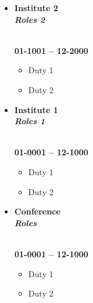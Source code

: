 \noindent\makebox[\linewidth]{\rule{\linewidth}{1.1pt}}
\vspace{-0.5cm}
\begin{itemize} \setlength\itemsep{-0.4em}
	\item \begin{multicols}{2}
		\begin{flushleft}
			\textbf{Institute 2}
			\\
			\textbf{\textit{Roles 2}}
		\end{flushleft}
		\columnbreak
		\begin{flushright}
			\hspace*{1em} \\
			\textbf{01-1001 -- 12-2000} 
		\end{flushright}
	\end{multicols}
	
	\vspace{-0.3cm}
	\begin{itemize}
		\item Duty 1
		\item Duty 2
	\end{itemize}
	
	\item \begin{multicols}{2}
		\begin{flushleft}
			\textbf{Institute 1}
			\\
			\textbf{\textit{Roles 1}}
		\end{flushleft}
		\columnbreak
		\begin{flushright}
			\hspace*{1em} \\
			\textbf{01-0001 -- 12-1000} 
		\end{flushright}
	\end{multicols}
	
	\vspace{-0.3cm}
	\begin{itemize}
		\item Duty 1
		\item Duty 2
	\end{itemize}
	
	\item \begin{multicols}{2}
		\begin{flushleft}
			\textbf{Conference}
			\\
			\textbf{\textit{Roles}}
		\end{flushleft}
		\columnbreak
		\begin{flushright}
			\hspace*{1em} \\
			\textbf{01-0001 -- 12-1000} 
		\end{flushright}
	\end{multicols}
	
	\vspace{-0.3cm}
	\begin{itemize}
		\item Duty 1
		\item Duty 2
	\end{itemize}
	
\end{itemize}	
